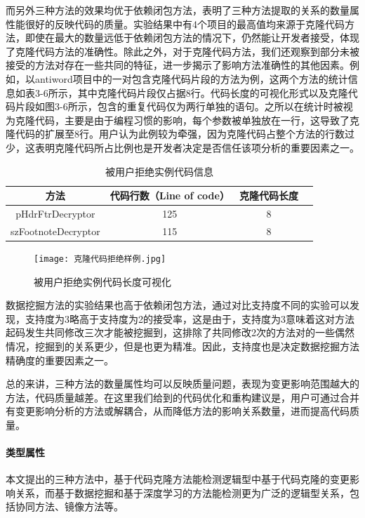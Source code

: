 而另外三种方法的效果均优于依赖闭包方法，表明了三种方法提取的关系的数量属性能很好的反映代码的质量。实验结果中有4个项目的最高值均来源于克隆代码方法，即使在最大的数量远低于依赖闭包方法的情况下，仍然能让开发者接受，体现了克隆代码方法的准确性。除此之外，对于克隆代码方法，我们还观察到部分未被接受的方法对存在一些共同的特征，进一步揭示了影响方法准确性的其他因素。例如，以antiword项目中的一对包含克隆代码片段的方法为例，这两个方法的统计信息如表3-6所示，其中克隆代码片段仅占据8行。代码长度的可视化形式以及克隆代码片段如图3-6所示，包含的重复代码仅为两行单独的语句。之所以在统计时被视为克隆代码，主要是由于编程习惯的影响，每个参数被单独放在一行，这导致了克隆代码的扩展至8行。用户认为此例较为牵强，因为克隆代码占整个方法的行数过少，这表明克隆代码所占比例也是开发者决定是否信任该项分析的重要因素之一。

\begin{table}[htbp]
\caption{被用户拒绝实例代码信息}
\vspace{0.5em}\centering\wuhao
\begin{tabular}{cccc}
\toprule
方法 & 代码行数（Line of code）  & 克隆代码长度\\
\midrule
pHdrFtrDecryptor & 125 & 8 \\
szFootnoteDecryptor  & 115 & 8 \\
\bottomrule
\end{tabular}
\end{table}

\begin{figure}[h]
\centering
\texttt{[image: 克隆代码拒绝样例.jpg]}
\caption{被用户拒绝实例代码长度可视化}
\end{figure}

数据挖掘方法的实验结果也高于依赖闭包方法，通过对比支持度不同的实验可以发现，支持度为3略高于支持度为2的接受率，这是由于，支持度为3意味着这对方法起码发生共同修改三次才能被挖掘到，这排除了共同修改2次的方法对的一些偶然情况，挖掘到的关系更少，但是也更为精准。因此，支持度也是决定数据挖掘方法精确度的重要因素之一。

总的来讲，三种方法的数量属性均可以反映质量问题，表现为变更影响范围越大的方法，代码质量越差。在这里我们给到的代码优化和重构建议是，用户可通过合并有变更影响分析的方法或解耦合，从而降低方法的影响关系数量，进而提高代码质量。


\paragraph{类型属性} 本文提出的三种方法中，基于代码克隆方法能检测逻辑型中基于代码克隆的变更影响关系，而基于数据挖掘和基于深度学习的方法能检测更为广泛的逻辑型关系，包括协同方法、镜像方法等。

